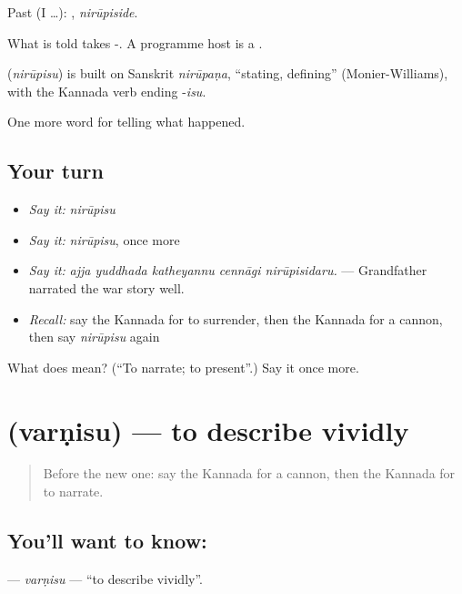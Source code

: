 Past (I …): , \emph{nirūpiside}.

What is told takes -. A programme host is a .

\begin{cousinweb}
\textbf{} (\emph{nirūpisu}) is built on Sanskrit \emph{nirūpaṇa}, \textquotedblleft{}stating, defining\textquotedblright{} (Monier-Williams), with the Kannada verb ending -\emph{isu}.
\end{cousinweb}

\begin{grammarlens}[title={What you've built}]
One more word for telling what happened.
\end{grammarlens}

\subsection*{Your turn}
\begin{itemize}
\raggedright
  \item \emph{Say it:} \emph{nirūpisu}
  \item \emph{Say it:} \emph{nirūpisu}, once more
  \item \emph{Say it:} \emph{ajja yuddhada katheyannu cennāgi nirūpisidaru.} — Grandfather narrated the war story well.
  \item \emph{Recall:} say the Kannada for to surrender, then the Kannada for a cannon, then say \emph{nirūpisu} again
\end{itemize}

\begin{tcolorbox}[breakable,colback=teal!4,colframe=teal!35!black,title={Before you move on}]
What does  mean? (\textquotedblleft{}To narrate; to present\textquotedblright{}.) Say it once more.
\end{tcolorbox}
\section[\texorpdfstring{\kn{ವರ್ಣಿಸು} (varṇisu)}{ವರ್ಣಿಸು (varṇisu)}]{ (varṇisu) — to describe vividly}

\label{lesson:KA-C343-varnisu}



\begin{quote}
Before the new one: say the Kannada for a cannon, then the Kannada for to narrate.
\end{quote}

\subsection*{You'll want to know: }
\textbf{} — \emph{varṇisu} — \textquotedblleft{}to describe vividly\textquotedblright{}.

